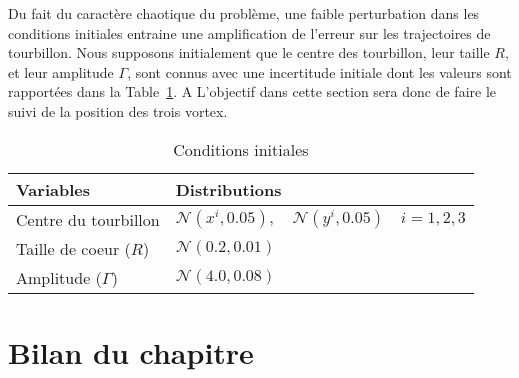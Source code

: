 Du fait du caractère chaotique du problème, une faible perturbation dans les conditions initiales entraine une amplification de l'erreur sur les trajectoires de tourbillon. Nous supposons initialement que le centre des tourbillon, leur taille $R$, et leur amplitude $\Gamma$, sont connus avec une incertitude initiale dont les valeurs sont rapportées dans la Table~\ref{tab:init_three_vortex}. A
L'objectif dans cette section sera donc de faire le suivi de la position des trois vortex.

\begin{table}[htbp]
    \centering
    \caption{Conditions initiales}
    \begin{tabular}[t]{|l|l|}
        \hline
        Variables             & Distributions                                                        \\
        \hline
        Centre du tourbillon  & $\mathcal N(x^i,0.05), \quad \mathcal N(y^i,0.05) \quad i = {1,2,3}$ \\
        Taille de coeur ($R$) & $\mathcal N(0.2, 0.01)$                                              \\
        Amplitude ($\Gamma$)  & $\mathcal N(4.0, 0.08)$                                              \\
        \hline
    \end{tabular}
    \label{tab:init_three_vortex}
\end{table}

\section{Bilan du chapitre}
